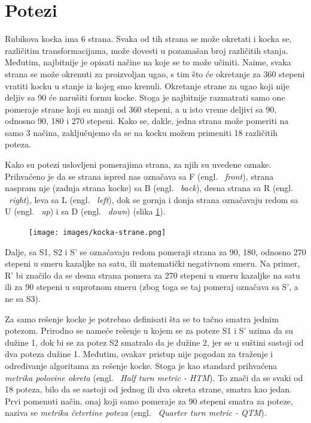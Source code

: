 \documentclass[a4paper]{article}
\begin{document}
\section{Potezi}	
\label{sec:potezi}

Rubikova kocka ima 6 strana. Svaka od tih strana se može okretati i kocka se, različitim transformacijama, može dovesti u pozamašan broj različitih stanja. Međutim, najbitnije je opisati načine na koje se to može učiniti. Naime, svaka strana se može okrenuti za proizvoljan ugao, s tim što će okretanje za 360 stepeni vratiti kocku u stanje iz kojeg smo krenuli. Okretanje strane za ugao koji nije deljiv sa 90 će narušiti formu kocke. Stoga je najbitnije razmatrati samo one pomeraje strane koji su manji od 360 stepeni, a u isto vreme deljivi sa 90, odnosno 90, 180 i 270 stepeni. Kako se, dakle, jedna strana može pomeriti na samo 3 načina, zaključujemo da se na kocku možem primeniti 18 različitih poteza.

Kako su potezi uslovljeni pomerajima strana, za njih su uvedene oznake. Prihvaćeno je da se strana ispred nas označava sa F (engl. ~{\em front}), strana naspram nje (zadnja strana kocke) sa B (engl. ~{\em back}), desna strana sa R (engl. ~{\em right}), leva sa L (engl. ~{\em left}), dok se gornja i donja strana označavaju redom sa U (engl. ~{\em up}) i sa D (engl. ~{\em down}) (slika \ref{fig:stranekocke}).

\begin{figure}
        \centering\texttt{[image: images/kocka-strane.png]} 
        \caption{}
        \label{fig:stranekocke}
\end{figure}

Dalje, sa S1, S2 i S' se označavaju redom pomeraji strana za 90, 180, odnosno 270 stepeni u smeru kazaljke na satu, ili matematički negativnom smeru. Na primer, R' bi značilo da se desna strana pomera za 270 stepeni u smeru kazaljke na satu ili za 90 stepeni u suprotnom smeru (zbog toga se taj pomeraj označava sa S', a ne sa S3).

Za samo rešenje kocke je potrebno definisati šta se to tačno smatra jednim potezom. Prirodno se nameće rešenje u kojem se za poteze S1 i S' uzima da su dužine 1, dok bi se za potez S2 smatralo da je dužine 2, jer se u suštini sastoji od dva poteza dužine 1. Međutim, ovakav pristup nije pogodan za traženje i određivanje algoritama za rešenje kocke. Stoga je kao standard prihvaćena \emph{metrika polovine okreta} (engl. ~{\em Half turn metric - HTM}). To znači da se svaki od 18 poteza, bilo da se sastoji od jednog ili dva okreta strane, smatra kao jedan. Prvi pomenuti način, onaj koji samo pomeraje za 90 stepeni smatra za poteze, naziva se \emph{metrika četvrtine poteza} (engl. ~{\em Quarter turn metric - QTM}). 
\end{document}
